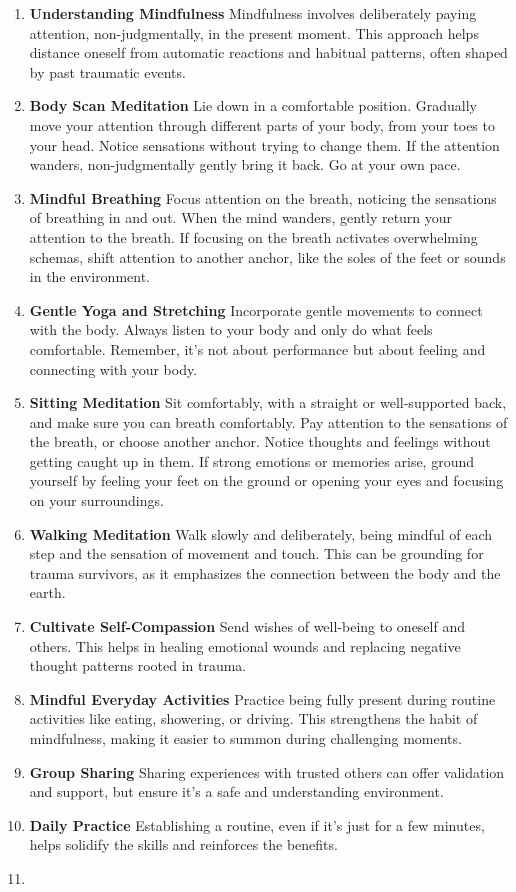 \documentclass[12pt,letterpaper]{article}
\begin{document}
\begin{enumerate}
    \item \textbf{Understanding Mindfulness} Mindfulness involves deliberately paying attention, non-judgmentally, in the present moment. This approach helps distance oneself from automatic reactions and habitual patterns, often shaped by past traumatic events. 
    \item \textbf{Body Scan Meditation} Lie down in a comfortable position. Gradually move your attention through different parts of your body, from your toes to your head. Notice sensations without trying to change them. If the attention wanders, non-judgmentally gently bring it back. Go at your own pace.
    \item \textbf{Mindful Breathing} Focus attention on the breath, noticing the sensations of breathing in and out. When the mind wanders, gently return your attention to the breath. If focusing on the breath activates overwhelming schemas, shift attention to another anchor, like the soles of the feet or sounds in the environment.
    \item \textbf{Gentle Yoga and Stretching} Incorporate gentle movements to connect with the body. Always listen to your body and only do what feels comfortable. Remember, it's not about performance but about feeling and connecting with your body.
    \item \textbf{Sitting Meditation} Sit comfortably, with a straight or well-supported back, and make sure you can breath comfortably. Pay attention to the sensations of the breath, or choose another anchor. Notice thoughts and feelings without getting caught up in them. If strong emotions or memories arise, ground yourself by feeling your feet on the ground or opening your eyes and focusing on your surroundings.
    \item \textbf{Walking Meditation} Walk slowly and deliberately, being mindful of each step and the sensation of movement and touch. This can be grounding for trauma survivors, as it emphasizes the connection between the body and the earth.
    \item \textbf{Cultivate Self-Compassion} Send wishes of well-being to oneself and others. This helps in healing emotional wounds and replacing negative thought patterns rooted in trauma. 
    \item \textbf{Mindful Everyday Activities} Practice being fully present during routine activities like eating, showering, or driving. This strengthens the habit of mindfulness, making it easier to summon during challenging moments.
    \item \textbf{Group Sharing} Sharing experiences with trusted others can offer validation and support, but ensure it's a safe and understanding environment.
    \item \textbf{Daily Practice} Establishing a routine, even if it's just for a few minutes, helps solidify the skills and reinforces the benefits.
    \item {}
\end{enumerate}
\end{document}
